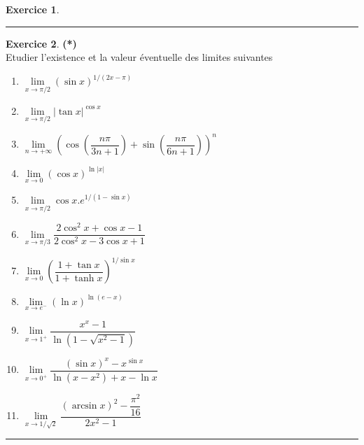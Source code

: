 \documentclass[a4paper,11pt]{article}
\theoremstyle{definition}
\newtheorem{exo}{Exercice} %
\begin{document}
\begin{minipage}{1\linewidth}
\begin{minipage}[t]{0.48\linewidth}
\begin{exo}
		\centering
		\rule{1\linewidth}{0.6pt}
	\end{exo}


	



	
		
	\end{minipage}
\end{minipage}
\newpage

\begin{minipage}{1\linewidth}
	\begin{minipage}[t]{0.48\linewidth}
		\raggedright
		
			\begin{exo}\textbf{(*)}\quad\\[0.2cm]
			Etudier l'existence et la valeur éventuelle des limites suivantes
			\begin{enumerate}
				\item $\displaystyle\lim\limits_{x\rightarrow \pi/2}(\sin x)^{1/(2x-\pi)}$
				\item $\displaystyle\lim\limits_{x\rightarrow \pi/2}|\tan x|^{\cos x}$
				\item $\displaystyle\lim\limits_{n\rightarrow +\infty}\left(\cos(\dfrac{n\pi}{3n+1})+\sin(\dfrac{n\pi}{6n+1})\right)^n$
				\item $\displaystyle\lim\limits_{x\rightarrow 0}(\cos x)^{\ln|x|}$
				\item $\displaystyle\lim\limits_{x\rightarrow \pi/2}\cos x.e^{1/(1-\sin x)}$
				\item $\displaystyle\lim\limits_{x\rightarrow \pi/3}\dfrac{2\cos^2x+\cos x-1}{2\cos^2x-3\cos x+1}$
				\item $\displaystyle\lim\limits_{x\rightarrow 0}\left(\dfrac{1+\tan x}{1+\tanh x}\right)^{1/\sin x}$
				\item $\displaystyle\lim\limits_{x\rightarrow e^-}(\ln x)^{\ln(e-x)}$
				\item $\displaystyle\lim\limits_{x\rightarrow 1^+}\dfrac{x^x-1}{\ln(1-\sqrt{x^2-1})}$
				\item $\displaystyle\lim\limits_{x\rightarrow 0^+}\dfrac{(\sin x)^x-x^{\sin x}}{\ln(x-x^2)+x-\ln x}$
				\item $\displaystyle\lim\limits_{x \rightarrow 1/\sqrt{2}}\dfrac{(\arcsin x)^2-\dfrac{\pi^2}{16}}{2x^2-1}$
			\end{enumerate}
			
			\centering
			\rule{1\linewidth}{0.6pt}
		\end{exo}
		
				
		

\end{minipage}
\end{minipage}
\end{document}
